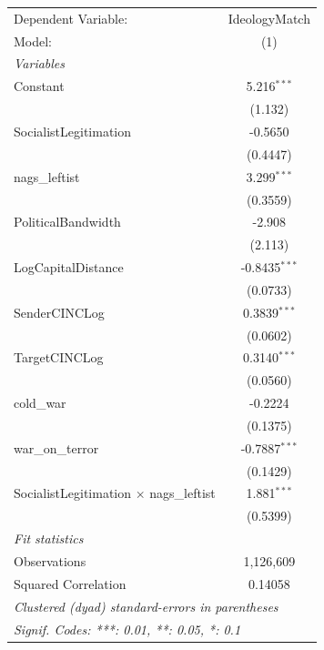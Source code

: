 
\begingroup
\centering
\begin{tabular}{lc}
   \tabularnewline \midrule \midrule
   Dependent Variable:                            & IdeologyMatch\\  
   Model:                                         & (1)\\  
   \midrule
   \emph{Variables}\\
   Constant                                       & 5.216$^{***}$\\   
                                                  & (1.132)\\   
   SocialistLegitimation                          & -0.5650\\   
                                                  & (0.4447)\\   
   nags\_leftist                                  & 3.299$^{***}$\\   
                                                  & (0.3559)\\   
   PoliticalBandwidth                             & -2.908\\   
                                                  & (2.113)\\   
   LogCapitalDistance                             & -0.8435$^{***}$\\   
                                                  & (0.0733)\\   
   SenderCINCLog                                  & 0.3839$^{***}$\\   
                                                  & (0.0602)\\   
   TargetCINCLog                                  & 0.3140$^{***}$\\   
                                                  & (0.0560)\\   
   cold\_war                                      & -0.2224\\   
                                                  & (0.1375)\\   
   war\_on\_terror                                & -0.7887$^{***}$\\   
                                                  & (0.1429)\\   
   SocialistLegitimation $\times$ nags\_leftist   & 1.881$^{***}$\\   
                                                  & (0.5399)\\   
   \midrule
   \emph{Fit statistics}\\
   Observations                                   & 1,126,609\\  
   Squared Correlation                            & 0.14058\\  
   \midrule \midrule
   \multicolumn{2}{l}{\emph{Clustered (dyad) standard-errors in parentheses}}\\
   \multicolumn{2}{l}{\emph{Signif. Codes: ***: 0.01, **: 0.05, *: 0.1}}\\
\end{tabular}
\par\endgroup


